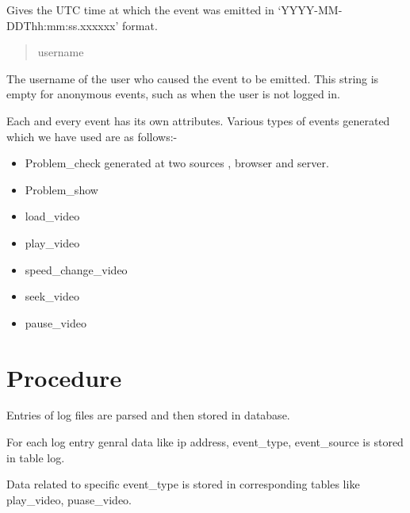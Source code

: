 \documentclass[a4paper,12pt,oneside]{sphinxmanual}
\begin{document}
\begin{DUlineblock}{0em}
\item[] Gives the UTC time at which the event was emitted in `YYYY-MM- DDThh:mm:ss.xxxxxx' format.
\end{DUlineblock}
\begin{quote}\begin{description}
\item[{username}] \leavevmode
\end{description}\end{quote}

\begin{DUlineblock}{0em}
\item[] The username of the user who caused the event to be emitted. This string is empty for anonymous events, such as when the user is not logged in.
\end{DUlineblock}

\begin{DUlineblock}{0em}
\item[] Each and every event has its own attributes. Various types of events generated which we have used are as follows:-
\end{DUlineblock}
\begin{itemize}
\item {} 
Problem\_check generated at two sources , browser and server.

\item {} 
Problem\_show

\item {} 
load\_video

\item {} 
play\_video

\item {} 
speed\_change\_video

\item {} 
seek\_video

\item {} 
pause\_video

\end{itemize}


\section{Procedure}
\label{document:procedure}
\begin{DUlineblock}{0em}
\item[] Entries of log files are parsed and then stored in database.
\item[] For each log entry genral data like ip address, event\_type, event\_source is stored in table log.
\item[] Data related to specific event\_type is stored in corresponding tables like play\_video, puase\_video.
\end{DUlineblock}
\end{document}
